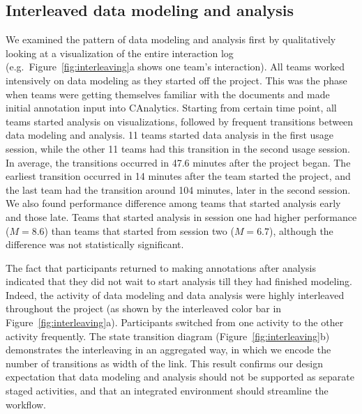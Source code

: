 \subsection{Interleaved data modeling and analysis}\label{interleaved-data-modeling-and-data-analysis}



We examined the pattern of data modeling and analysis first by
qualitatively looking at a visualization of the entire interaction log
(e.g.~Figure~\ref{fig:interleaving}a shows one team's interaction). All teams
worked intensively on data modeling as they started off the project.
This was the phase when teams were getting themselves familiar with the
documents and made initial annotation input into CAnalytics. Starting from certain
time point, all teams started analysis on visualizations,
followed by frequent transitions between data modeling and analysis. 11
teams started data analysis in the first usage session, while the other
11 teams had this transition in the second usage session. In average,
the transitions occurred in 47.6 minutes after the project began. The earliest transition occurred in 14 minutes after the team started the project, and the last team
had the transition around 104 minutes, later in the second session. We
also found performance difference among teams that started analysis
early and those late. Teams that started analysis in session one had
higher performance ($M=8.6$) than teams that started from session two
($M=6.7$), although the difference was not statistically significant.

The fact that participants returned to making annotations after analysis
indicated that they did not wait to start analysis till they had
finished modeling. Indeed, the activity of data modeling and data
analysis were highly interleaved throughout the project (as shown by the interleaved color bar in Figure~\ref{fig:interleaving}a). Participants switched from
one activity to the other activity frequently. The state transition
diagram (Figure~\ref{fig:interleaving}b) demonstrates the interleaving in an aggregated way, in which we
encode the number of transitions as width of the link. This result
confirms our design expectation that data modeling and analysis should
not be supported as separate staged activities, and that an integrated
environment should streamline the workflow.

